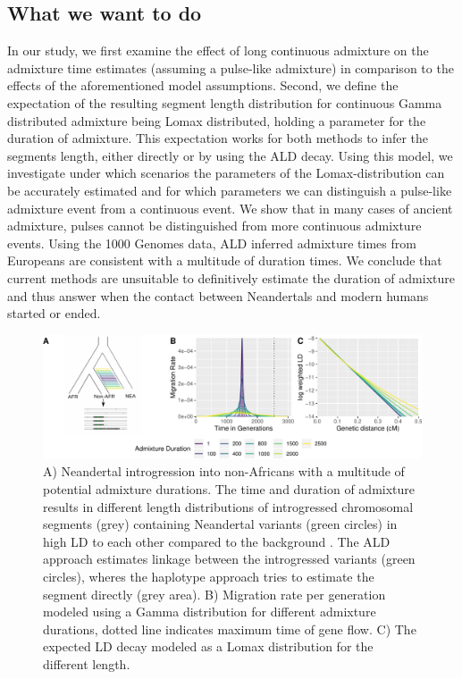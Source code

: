\documentclass[]{article}
\begin{document}
\subsection{What we want to do}\label{what-we-want-to-do}
In our  study, we first examine the  effect of long
continuous admixture on the admixture time estimates (assuming a pulse-like admixture) in comparison to
the effects of the aforementioned model assumptions. Second, we define
the expectation of the resulting segment length distribution for
continuous Gamma distributed admixture being Lomax distributed, holding
a parameter for the duration of admixture. This expectation works for
both methods to infer the segments length, either directly or by using
the ALD decay. Using this model, we investigate under which scenarios
the parameters of the Lomax-distribution can be accurately estimated and
for which parameters we can distinguish a pulse-like admixture event
from a continuous event. We show that in many cases of ancient admixture, pulses cannot be
distinguished from more continuous admixture events. Using the 1000 Genomes data, ALD inferred admixture times from Europeans are consistent with a multitude of duration times.
We conclude that current
methods are unsuitable to definitively estimate the duration of admixture and thus answer when the contact between
Neandertals and modern humans started or ended.

\begin{figure}
\centering
\includegraphics{Admixture_Time_Inference_Paper_Draft_files/figure-latex/fig1-1.pdf}
\caption{\label{fig:fig1} A) Neandertal introgression into non-Africans with a multitude of potential admixture durations. The time and duration of admixture results in different length distributions of introgressed chromosomal segments (grey) containing  Neandertal variants (green circles)  in high LD to each other
compared to the background . The ALD approach estimates linkage
between the introgressed variants (green circles), wheres the haplotype approach tries
to estimate the segment directly (grey area). B) Migration rate per generation
modeled using a Gamma distribution for different admixture durations,
dotted line indicates maximum time of gene flow. C) The expected LD
decay modeled as a Lomax distribution for the different length.}
\end{figure}


\end{document}
